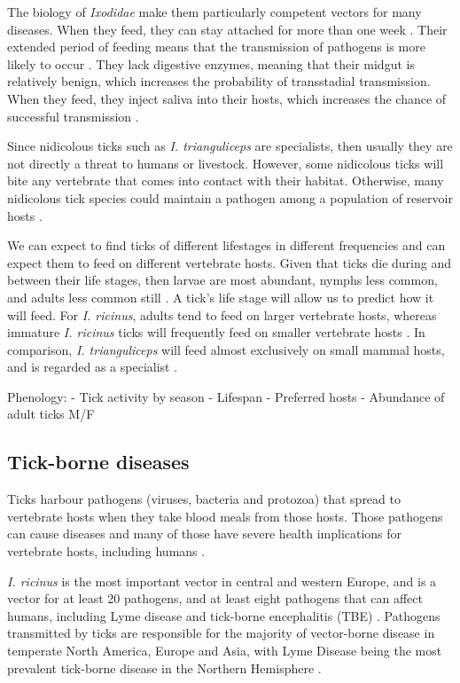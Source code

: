 \documentclass{article}
\begin{document}
The biology of \textit{Ixodidae} make them particularly competent vectors for many diseases. When they feed, they can stay attached for more than one week \cite{Johnson2023b}. Their extended period of feeding means that the transmission of pathogens is more likely to occur \cite{Gray2024}. They lack digestive enzymes, meaning that their midgut is relatively benign, which increases the probability of transstadial transmission. When they feed, they inject saliva into their hosts, which increases the chance of successful transmission \cite{Gray2024}.

Since nidicolous ticks such as \textit{I. trianguliceps} are specialists, then usually they are not directly a threat to humans or livestock. However, some nidicolous ticks will bite any vertebrate that comes into contact with their habitat. Otherwise, many nidicolous tick species could maintain a pathogen among a population of reservoir hosts \cite{gray2014}.

We can expect to find ticks of different lifestages in different frequencies and can expect them to feed on different vertebrate hosts. Given that ticks die during and between their life stages, then larvae are most abundant, nymphs less common, and adults less common still \cite{Randolph1998}. A tick's life stage will allow us to predict how it will feed. For \textit{I. ricinus}, adults tend to feed on larger vertebrate hosts, whereas immature \textit{I. ricinus} ticks will frequently feed on smaller vertebrate hosts \cite{Herrmann2015, Randolph1998}. In comparison, \textit{I. trianguliceps} will feed almost exclusively on small mammal hosts, and is regarded as a specialist \cite{Bown2003, Bown2008}.

Phenology:
- Tick activity by season
- Lifespan
- Preferred hosts
- Abundance of adult ticks M/F

\subsection{Tick-borne diseases}

Ticks harbour pathogens (viruses, bacteria and protozoa) that spread to vertebrate hosts when they take blood meals from those hosts. Those pathogens can cause diseases and many of those have severe health implications for vertebrate hosts, including humans \cite{Johnson2023e}.

\textit{I. ricinus} is the most important vector in central and western Europe, and is a vector for at least 20 pathogens, and at least eight pathogens that can affect humans, including Lyme disease and tick-borne encephalitis (TBE) \cite{Gray2024}. Pathogens transmitted by ticks are responsible for the majority of vector-borne disease in temperate North America, Europe and Asia, with Lyme Disease being the most prevalent tick-borne disease in the Northern Hemisphere \cite{Rochlin2020}. 
\end{document}
